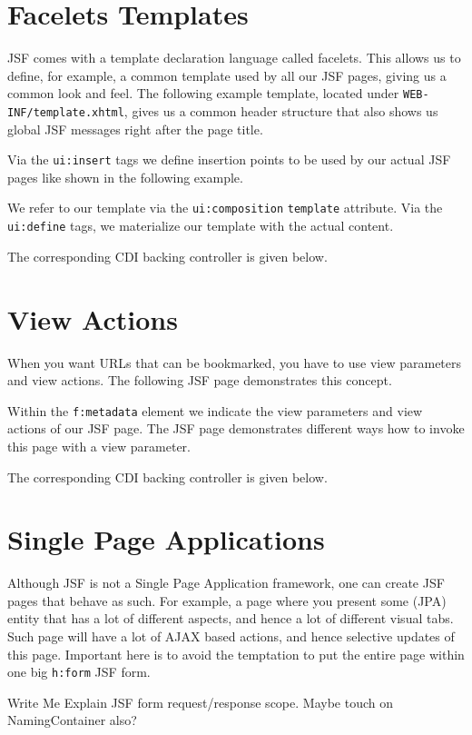 \section{Facelets Templates}
JSF comes with a template declaration language called facelets.
This allows us to define, for example, a common template used by all our JSF pages,
giving us a common look and feel.
The following example template, located under \texttt{WEB-INF/template.xhtml},
gives us a common header structure that also shows us global JSF messages right after the page title.

Via the \texttt{ui:insert} tags we define insertion points to be used by our actual JSF pages like shown in the following example.

We refer to our template via the \texttt{ui:composition} \texttt{template} attribute.
Via the \texttt{ui:define} tags, we materialize our template with the actual content.

The corresponding CDI backing controller is given below.


\section{View Actions}
When you want URLs that can be bookmarked, you have to use view parameters and view actions.
The following JSF page demonstrates this concept.

Within the \texttt{f:metadata} element we indicate the view parameters and view actions of our JSF page.
The JSF page demonstrates different ways how to invoke this page with a view parameter.

The corresponding CDI backing controller is given below.


\section{Single Page Applications}
Although JSF is not a Single Page Application framework, one can create JSF pages that behave as such.
For example, a page where you present some (JPA) entity that has a lot of different aspects, and hence a lot of different visual tabs.
Such page will have a lot of AJAX based actions, and hence selective updates of this page.
Important here is to avoid the temptation to put the entire page within one big \texttt{h:form} JSF form.
\begin{TODO}{Write Me}
Explain JSF form request/response scope.
Maybe touch on NamingContainer also?
\end{TODO}